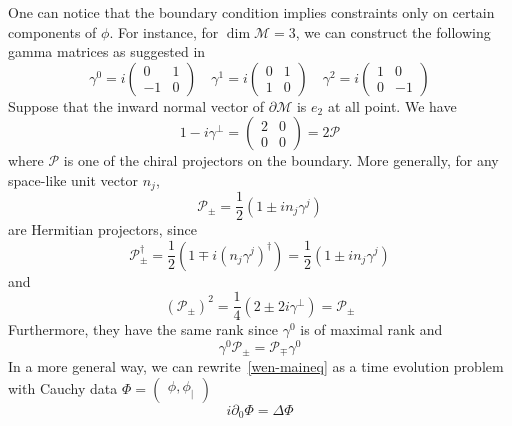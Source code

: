 One can notice that the boundary condition implies constraints only on certain components of $\phi$. 
For instance, for $\dim \mathcal{M} = 3$, we can construct the following gamma matrices as suggested in~\cite{Polchinski1998}
\begin{equation*}
\gamma^0 = i\begin{pmatrix} 0 & 1 \\ -1 & 0 \end{pmatrix}  \quad
\gamma^1 = i\begin{pmatrix} 0 & 1 \\ 1 & 0 \end{pmatrix}  \quad
\gamma^2 = i\begin{pmatrix} 1 & 0 \\ 0 & -1 \end{pmatrix}  
\end{equation*}
Suppose that the inward normal vector of $\partial \mathcal{M}$ is $e_2$ at all point.
We have
\begin{equation*}
1 - i\gamma^\bot = 
\begin{pmatrix} 2 & 0 \\ 0 & 0\end{pmatrix} = 2 \mathcal{P}
\end{equation*}
where $\mathcal{P}$ is one of the chiral projectors on the boundary. 
More generally, for any space-like unit vector $n_j$,
\begin{equation*}
\mathcal{P}_\pm = \frac{1}{2}(1 \pm i n_j\gamma^j) 
\end{equation*}
are Hermitian projectors, since 
\begin{equation*}
\mathcal{P}_\pm^\dagger = 
\frac{1}{2}(1 \mp i (n_j \gamma^j)^\dagger)=
\frac{1}{2}(1 \pm i n_j \gamma^j)
\end{equation*}
and
\begin{equation*}
(\mathcal{P}_\pm)^{2} = \frac{1}{4}(2\pm 2i \gamma^\bot) = \mathcal{P}_\pm
\end{equation*}
Furthermore, they have the same rank since $\gamma^0$ is of maximal rank and
\begin{equation*}
\gamma^0\mathcal{P}_\pm = \mathcal{P}_\mp\gamma^0
\end{equation*}
In a more general way, 
we can rewrite~\cref{wen-maineq} as a time evolution problem with Cauchy data
$\Phi = \begin{pmatrix}
\phi, \phi_|
\end{pmatrix}$
\begin{equation*}
i\partial_0 \Phi = \Delta \Phi
\end{equation*}

